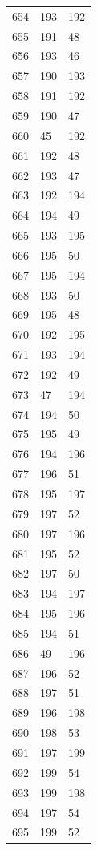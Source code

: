 \documentclass[a4paper,11pt]{article}
\begin{document}
\begin{center}
\begin{longtable}{|R{1.5cm}|R{1.5cm}|R{1.5cm}|}
  654 &  193 &  192 \\
  655 &  191 &   48 \\
  656 &  193 &   46 \\
  657 &  190 &  193 \\
  658 &  191 &  192 \\
  659 &  190 &   47 \\
  660 &   45 &  192 \\
  661 &  192 &   48 \\
  662 &  193 &   47 \\
  663 &  192 &  194 \\
  664 &  194 &   49 \\
  665 &  193 &  195 \\
  666 &  195 &   50 \\
  667 &  195 &  194 \\
  668 &  193 &   50 \\
  669 &  195 &   48 \\
  670 &  192 &  195 \\
  671 &  193 &  194 \\
  672 &  192 &   49 \\
  673 &   47 &  194 \\
  674 &  194 &   50 \\
  675 &  195 &   49 \\
  676 &  194 &  196 \\
  677 &  196 &   51 \\
  678 &  195 &  197 \\
  679 &  197 &   52 \\
  680 &  197 &  196 \\
  681 &  195 &   52 \\
  682 &  197 &   50 \\
  683 &  194 &  197 \\
  684 &  195 &  196 \\
  685 &  194 &   51 \\
  686 &   49 &  196 \\
  687 &  196 &   52 \\
  688 &  197 &   51 \\
  689 &  196 &  198 \\
  690 &  198 &   53 \\
  691 &  197 &  199 \\
  692 &  199 &   54 \\
  693 &  199 &  198 \\
  694 &  197 &   54 \\
  695 &  199 &   52 \\

\end{longtable}
\end{center}
\end{document}
